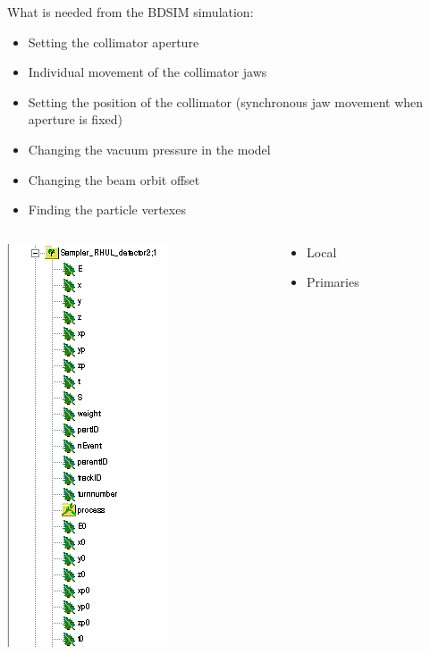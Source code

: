 \documentclass[xcolor={dvipsnames}]{beamer}
\begin{document}
\begin{frame}
What is needed from the BDSIM simulation:
\begin{itemize}
 \item Setting the collimator aperture
 \item Individual movement of the collimator jaws
 \item Setting the position of the collimator {\small{(synchronous jaw movement when aperture is fixed)}}
 \item Changing the vacuum pressure in the model
 \item Changing the beam orbit offset
 \item Finding the particle vertexes
\end{itemize}


\begin{columns}
\begin{column}[c]{0.2\textwidth}
 \centering
\includegraphics[height=0.5\textheight]{figures/ROOT_Tree1.png}
 \end{column}
 \begin{column}[c]{0.2\textwidth}
\begin{itemize}
 \item Local\\
 \vspace*{1.8cm}
 \item Primaries
\end{itemize}
 \end{column}

\end{columns}
\end{frame}
\end{document}
